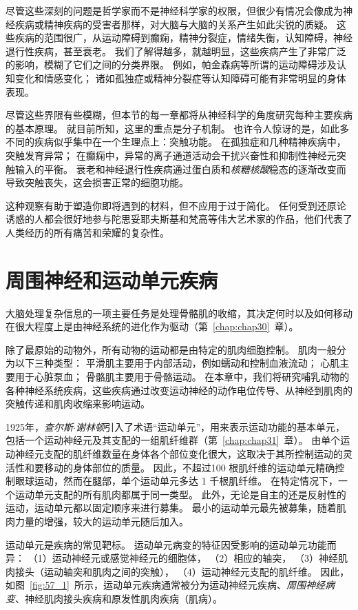 尽管这些深刻的问题是哲学家而不是神经科学家的权限，但很少有情况会像成为神经疾病或精神疾病的受害者那样，对大脑与大脑的关系产生如此尖锐的质疑。
这些疾病的范围很广，从运动障碍到癫痫，精神分裂症，情绪失衡，认知障碍，神经退行性疾病，甚至衰老。
我们了解得越多，就越明显，这些疾病产生了非常广泛的影响，模糊了它们之间的分类界限。
例如，帕金森病等所谓的运动障碍涉及认知变化和情感变化；
诸如孤独症或精神分裂症等认知障碍可能有非常明显的身体表现。


尽管这些界限有些模糊，但本节的每一章都将从神经科学的角度研究每种主要疾病的基本原理。
就目前所知，这里的重点是分子机制。
也许令人惊讶的是，如此多不同的疾病似乎集中在一个生理点上：突触功能。
在孤独症和几种精神疾病中，突触发育异常；
在癫痫中，异常的离子通道活动会干扰兴奋性和抑制性神经元突触输入的平衡。
衰老和神经退行性疾病通过蛋白质和\textit{核糖核酸}稳态的逐渐改变而导致突触丧失，这会损害正常的细胞功能。


这种观察有助于塑造你即将遇到的材料，但不应用于过于简化。
任何受到还原论诱惑的人都会很好地参与陀思妥耶夫斯基和梵高等伟大艺术家的作品，他们代表了人类经历的所有痛苦和荣耀的复杂性。




\chapter{周围神经和运动单元疾病} \label{chap:chap57}

大脑处理复杂信息的一项主要任务是处理骨骼肌的收缩，其决定何时以及如何移动在很大程度上是由神经系统的进化作为驱动（第~\ref{chap:chap30}~章）。


除了最原始的动物外，所有动物的运动都是由特定的肌肉细胞控制。
肌肉一般分为以下三种类型：
平滑肌主要用于内部活动，例如蠕动和控制血液流动；
心肌主要用于心脏泵血；
骨骼肌主要用于骨骼运动。
在本章中，我们将研究哺乳动物的各种神经系统疾病，这些疾病通过改变运动神经的动作电位传导、从神经到肌肉的突触传递和肌肉收缩来影响运动。


1925年，\textit{查尔斯$\cdot$谢林顿}引入了术语“运动单元”，用来表示运动功能的基本单元，包括一个运动神经元及其支配的一组肌纤维群（第~\ref{chap:chap31}~章）。
由单个运动神经元支配的肌纤维数量在身体各个部位变化很大，这取决于其所控制运动的灵活性和要移动的身体部位的质量。
因此，不超过100 根肌纤维的运动单元精确控制眼球运动，然而在腿部，单个运动单元多达 1 千根肌纤维。
在特定情况下，一个运动单元支配的所有肌肉都属于同一类型。
此外，无论是自主的还是反射性的运动，运动单元都以固定顺序来进行募集。
最小的运动单元最先被募集，随着肌肉力量的增强，较大的运动单元随后加入。


运动单元是疾病的常见靶标。
运动单元病变的特征因受影响的运动单元功能而异：
（1）运动神经元或感觉神经元的细胞体，
（2）相应的轴突，
（3）神经肌肉接头（运动轴突和肌肉之间的突触），
（4）运动神经元支配的肌纤维。
因此，如图~\ref{fig:57_1}~所示，运动单元疾病通常被分为运动神经元疾病、\textit{周围神经病变}、神经肌肉接头疾病和原发性肌肉疾病（肌病）。


